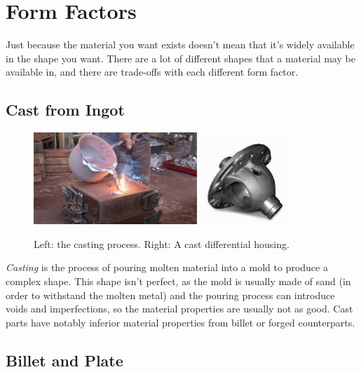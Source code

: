  \section{Form Factors}
 
 Just because the material you want exists doesn't mean that it's widely available in the shape you want. There are a lot of different shapes that a material may be available in, and there are trade-offs with each different form factor.
 
 \subsection{Cast from Ingot}
\begin{figure}[H]
	\includegraphics[width=0.55\textwidth]{imgs/casting_proc.jpeg}
	\qquad
	\includegraphics[width=0.3\textwidth]{imgs/casting_part.jpeg}
	\caption{Left: the casting process. Right: A cast differential housing.}
\end{figure} 
 \textit{Casting} is the process of pouring molten material into a mold to produce a complex shape. This shape isn't perfect, as the mold is usually made of sand (in order to withstand the molten metal) and the pouring process can introduce voids and imperfections, so the material properties are usually not as good. Cast parts have notably inferior material properties from billet or forged counterparts.
 
 \subsection{Billet and Plate}
 
